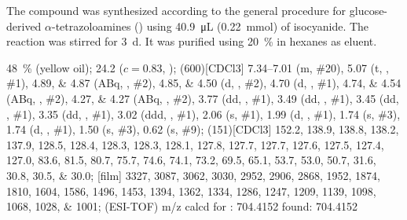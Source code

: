 The compound was synthesized according to the general procedure for glucose-derived $\alpha$-tetrazoloamines () using \SI{40.9}{\micro\liter} (\SI{0.22}{\milli\mol}) of  isocyanide.
The reaction was stirred for \SI{3}{\day}.
It was purified using \SI{20}{\percent}  in hexanes as eluent.
\begin{fullexp}
	 \SI{48}{\percent} (yellow oil); 
	\data{[$\alpha^{23}_D$]~$=$} \num{24.2} ($c = 0.83$, ); 
	\NMR(600)[CDCl3] \numrange{7.34}{7.01} (m, \#{20}), \num{5.07} (t, , \#{1}), \numlist{4.89;4.87} (ABq, , \#{2}), \numlist{4.85;4.50} (d, , \#{2}), \num{4.70} (d, , \#{1}), \numlist{4.74;4.54} (ABq, , \#{2}), \numlist{4.27;4.27} (ABq, , \#{2}), \num{3.77} (dd, , \#{1}), \num{3.49} (dd, , \#{1}), \num{3.45} (dd, , \#{1}), \num{3.35} (dd, , \#{1}), \num{3.02} (ddd, , \#{1}), \num{2.06} (s, \#{1}), \num{1.99} (d, , \#{1}), \num{1.74} (s, \#{3}), \num{1.74} (d, , \#{1}), \num{1.50} (s, \#{3}), \num{0.62} (s, \#{9}); 
	(151)[CDCl3] \numlist{152.2; 138.9; 138.8; 138.2; 137.9; 128.5; 128.4; 128.3; 128.3; 128.1; 127.8; 127.7; 127.7; 127.6; 127.5; 127.4; 127.0; 83.6; 81.5; 80.7; 75.7; 74.6; 74.1; 73.2; 69.5; 65.1; 53.7; 53.0; 50.7; 31.6; 30.8; 30.5; 30.0}; 
	[film] \numlist{3327; 3087; 3062; 3030; 2952; 2906; 2868; 1952; 1874; 1810; 1604; 1586; 1496; 1453; 1394; 1362; 1334; 1286; 1247; 1209; 1139; 1098; 1068; 1028; 1001}; 
	 (ESI-TOF) m/z calcd for : \num{704.4152} found: \num{704.4152}
\end{fullexp}

